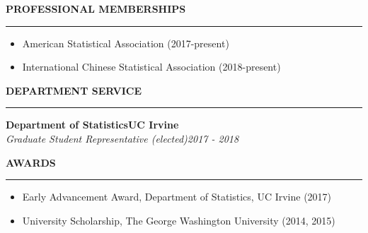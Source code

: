 {	\vspace{12pt}
	\textbf{\uppercase{Professional memberships}} \hrule 
	\vspace{-0.15 in}
	\begin{itemize} \setlength{\itemsep}{2pt}  \setlength{\parskip}{0pt}
		\item American Statistical Association (2017-present)
		\item International Chinese Statistical Association (2018-present)
	\end{itemize}


	\vspace{12pt}
	\textbf{\uppercase{Department service}} \hrule 
	
	{\bf Department of Statistics\hfill UC Irvine}  \\
	{\em Graduate Student Representative (elected)}\hfill {\em 2017 - 2018}

	\vspace{12pt}
	\textbf{\uppercase{Awards}} \hrule 
	\vspace{-0.15 in}
	\begin{itemize} \setlength{\itemsep}{2pt}  \setlength{\parskip}{0pt}
		\item Early Advancement Award, Department of Statistics, UC Irvine (2017)
		\item University Scholarship, The George Washington University (2014, 2015)
	\end{itemize}
}


